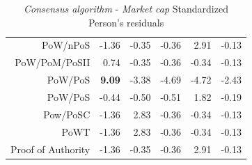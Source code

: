 \documentclass{bmcart}
\begin{document}
\begin{backmatter}
\begin{table}[ht]
\begin{tabular}{rrrrrr}
		PoW/nPoS & -1.36 & -0.35 & -0.36 & 2.91 & -0.13 \\ 
		PoW/PoM/PoSII & 0.74 & -0.35 & -0.36 & -0.34 & -0.13 \\ 
		PoW/PoS & \textbf{9.09} & -3.38 & -4.69 & -4.72 & -2.43 \\ 
		PoW/PoS  & -0.44 & -0.50 & -0.51 & 1.82 & -0.19 \\ 
		Pow/PoSC & -1.36 & 2.83 & -0.36 & -0.34 & -0.13 \\ 
		PoWT & -1.36 & 2.83 & -0.36 & -0.34 & -0.13 \\ 
		Proof of Authority & -1.36 & -0.35 & -0.36 & 2.91 & -0.13 \\ 
		\hline
	\end{tabular}
	\caption{\textit{Consensus algorithm} - \textit{Market cap} Standardized Person's residuals}
	\label{tab:ConsensusPercMKCaP}
\end{table}


\end{backmatter}
\end{document}
